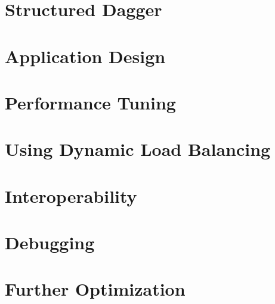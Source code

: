 \documentclass{beamer}
\begin{document}
\section[Charm++]{Structured Dagger}


\section[Application Design]{Application Design}

\section[Tuning]{Performance Tuning}

\section[LB]{Using Dynamic Load Balancing}

\section[AMPI & Interop]{Interoperability}

\section[Debugging]{Debugging}


\section[Messages, Groups, Shared Mem]{Further Optimization}


\end{document}
